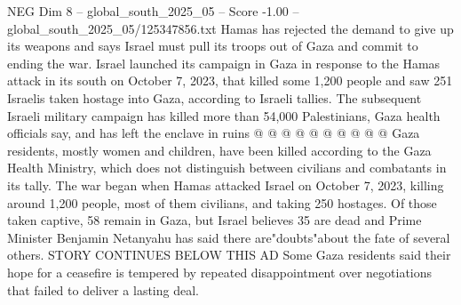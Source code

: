 \begin{textsample}{NEG Dim 8 – global\_south\_2025\_05 – Score -1.00 – global\_south\_2025\_05/125347856.txt}
Hamas has rejected the demand to give up its weapons and says Israel must pull its troops out of Gaza and commit to ending the war.
Israel launched its campaign in Gaza in response to the Hamas attack in its south on October 7, 2023, that killed some 1,200 people and saw 251 Israelis taken hostage into Gaza, according to Israeli tallies.
The subsequent Israeli military campaign has killed more than 54,000 Palestinians, Gaza health officials say, and has left the enclave in ruins @ @ @ @ @ @ @ @ @ @ Gaza residents, mostly women and children, have been killed according to the Gaza Health Ministry, which does not distinguish between civilians and combatants in its tally.
The war began when Hamas attacked Israel on October 7, 2023, killing around 1,200 people, most of them civilians, and taking 250 hostages.
Of those taken captive, 58 remain in Gaza, but Israel believes 35 are dead and Prime Minister Benjamin Netanyahu has said there are"doubts"about the fate of several others.
STORY CONTINUES BELOW THIS AD Some Gaza residents said their hope for a ceasefire is tempered by repeated disappointment over negotiations that failed to deliver a lasting deal.

\end{textsample}
